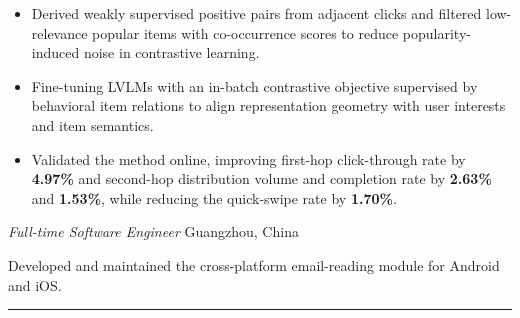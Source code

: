 \documentclass{resume}
\begin{document}
\begin{itemize}
  \item Derived weakly supervised positive pairs from adjacent clicks and filtered low-relevance popular items with co-occurrence scores to reduce popularity-induced noise in contrastive learning.
  \item Fine-tuning LVLMs with an in-batch contrastive objective supervised by behavioral item relations to align representation geometry with user interests and item semantics.

\item Validated the method online, improving first-hop click-through rate by \textbf{4.97\%} and second-hop distribution volume and completion rate by \textbf{2.63\%} and \textbf{1.53\%}, while reducing the quick-swipe rate by \textbf{1.70\%}.
\end{itemize}


\textit{Full-time Software Engineer}
\hfill Guangzhou, China

Developed and maintained the cross-platform email-reading module for Android and iOS.

\vspace{-0.5em}
\noindent\rule{\textwidth}{0.2pt}





\end{document}
